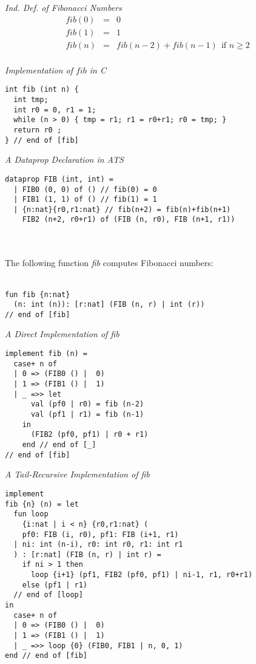 \documentclass[pdf]{prosper}
\begin{document}
\begin{slide}{\em Ind. Def. of Fibonacci Numbers}
$$\begin{array}{rcl}
fib(0) & = & 0 \\
fib(1) & = & 1 \\
fib(n) & = & fib(n-2)+fib(n-1)~~\mbox{if $n \geq 2$} \\
\end{array}$$
\end{slide}
\begin{slide}{\em Implementation of $fib$ in C}
{\blue\begin{verbatim}
int fib (int n) {
  int tmp;
  int r0 = 0, r1 = 1;
  while (n > 0) { tmp = r1; r1 = r0+r1; r0 = tmp; }
  return r0 ;
} // end of [fib]
\end{verbatim}}
\end{slide}
\begin{slide}{\em A Dataprop Declaration in ATS}
{\blue\begin{verbatim}
dataprop FIB (int, int) =
  | FIB0 (0, 0) of () // fib(0) = 0
  | FIB1 (1, 1) of () // fib(1) = 1
  | {n:nat}{r0,r1:nat} // fib(n+2) = fib(n)+fib(n+1)
    FIB2 (n+2, r0+r1) of (FIB (n, r0), FIB (n+1, r1))
\end{verbatim}
}~\\~\\
The following function {\it fib} computes Fibonacci numbers:\\~\\
{\blue\begin{verbatim}
fun fib {n:nat}
  (n: int (n)): [r:nat] (FIB (n, r) | int (r))
// end of [fib]
\end{verbatim}
}
\vfill
\end{slide}
\begin{slide}{\em A Direct Implementation of {\it fib}}
{\blue\begin{verbatim}
implement fib (n) =
  case+ n of
  | 0 => (FIB0 () |  0)
  | 1 => (FIB1 () |  1)
  | _ =>> let
      val (pf0 | r0) = fib (n-2)
      val (pf1 | r1) = fib (n-1)
    in
      (FIB2 (pf0, pf1) | r0 + r1)
    end // end of [_]
// end of [fib]
\end{verbatim}
}
\end{slide}
\begin{slide}{\em A Tail-Recursive Implementation of {\it fib}}
{
\fontsize{10}{10}
\blue\begin{verbatim}
implement
fib {n} (n) = let
  fun loop
    {i:nat | i < n} {r0,r1:nat} (
    pf0: FIB (i, r0), pf1: FIB (i+1, r1)
  | ni: int (n-i), r0: int r0, r1: int r1
  ) : [r:nat] (FIB (n, r) | int r) =
    if ni > 1 then
      loop {i+1} (pf1, FIB2 (pf0, pf1) | ni-1, r1, r0+r1)
    else (pf1 | r1)
  // end of [loop]
in
  case+ n of
  | 0 => (FIB0 () |  0)
  | 1 => (FIB1 () |  1)
  | _ =>> loop {0} (FIB0, FIB1 | n, 0, 1)
end // end of [fib]
\end{verbatim}
}
\end{slide}
\end{document}
